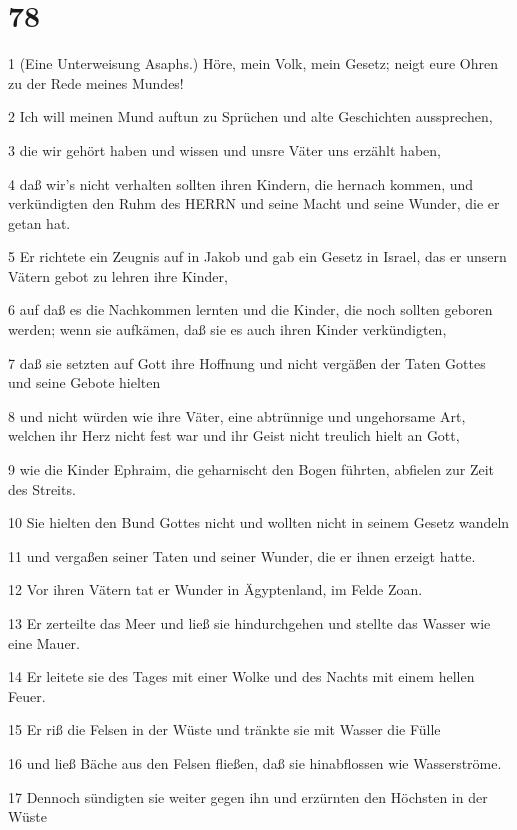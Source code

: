 \chapter{78}

\par 1 (Eine Unterweisung Asaphs.) Höre, mein Volk, mein Gesetz; neigt eure Ohren zu der Rede meines Mundes!
\par 2 Ich will meinen Mund auftun zu Sprüchen und alte Geschichten aussprechen,
\par 3 die wir gehört haben und wissen und unsre Väter uns erzählt haben,
\par 4 daß wir's nicht verhalten sollten ihren Kindern, die hernach kommen, und verkündigten den Ruhm des HERRN und seine Macht und seine Wunder, die er getan hat.
\par 5 Er richtete ein Zeugnis auf in Jakob und gab ein Gesetz in Israel, das er unsern Vätern gebot zu lehren ihre Kinder,
\par 6 auf daß es die Nachkommen lernten und die Kinder, die noch sollten geboren werden; wenn sie aufkämen, daß sie es auch ihren Kinder verkündigten,
\par 7 daß sie setzten auf Gott ihre Hoffnung und nicht vergäßen der Taten Gottes und seine Gebote hielten
\par 8 und nicht würden wie ihre Väter, eine abtrünnige und ungehorsame Art, welchen ihr Herz nicht fest war und ihr Geist nicht treulich hielt an Gott,
\par 9 wie die Kinder Ephraim, die geharnischt den Bogen führten, abfielen zur Zeit des Streits.
\par 10 Sie hielten den Bund Gottes nicht und wollten nicht in seinem Gesetz wandeln
\par 11 und vergaßen seiner Taten und seiner Wunder, die er ihnen erzeigt hatte.
\par 12 Vor ihren Vätern tat er Wunder in Ägyptenland, im Felde Zoan.
\par 13 Er zerteilte das Meer und ließ sie hindurchgehen und stellte das Wasser wie eine Mauer.
\par 14 Er leitete sie des Tages mit einer Wolke und des Nachts mit einem hellen Feuer.
\par 15 Er riß die Felsen in der Wüste und tränkte sie mit Wasser die Fülle
\par 16 und ließ Bäche aus den Felsen fließen, daß sie hinabflossen wie Wasserströme.
\par 17 Dennoch sündigten sie weiter gegen ihn und erzürnten den Höchsten in der Wüste
